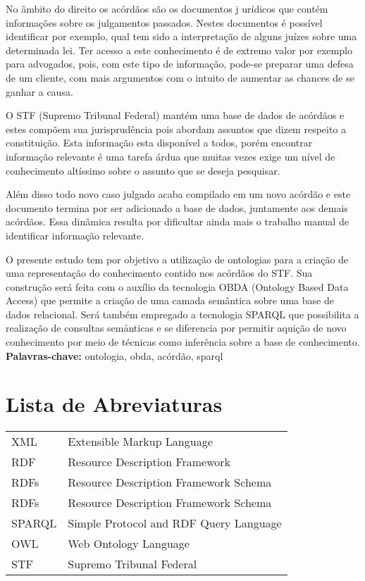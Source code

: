 \documentclass[11pt,twoside,a4paper]{book}
\begin{document}
No âmbito do direito os acórdãos são os documentos j    urídicos que contém informações 
sobre os julgamentos passados. Nestes documentos é possível identificar por exemplo,
qual tem sido a interpretação de alguns juízes sobre uma determinada lei. Ter
acesso a este conhecimento é de extremo valor por exemplo para advogados, pois, 
com este tipo de informação, pode-se preparar uma defesa de um cliente, com mais 
argumentos com o intuito de aumentar as chances de se ganhar a causa.

O STF (Supremo Tribunal Federal) mantém uma base de dados de acórdãos e estes
compõem sua jurisprudência pois abordam assuntos que dizem respeito a constituição. 
Esta informação esta disponível a todos, porém encontrar informação relevante é 
uma tarefa árdua que muitas vezes exige um nível de conhecimento altíssimo sobre 
o assunto que se deseja pesquisar.

Além disso todo novo caso julgado acaba compilado em um novo acórdão e este documento
termina por ser adicionado a base de dados, juntamente aos demais acórdãos. Essa
dinâmica resulta por dificultar ainda mais o trabalho manual de identificar 
informação relevante.

O presente estudo tem por objetivo a utilização de ontologias para a criação de 
uma representação do conhecimento contido nos acórdãos do STF. Sua construção será 
feita com o auxílio da tecnologia OBDA (Ontology Based Data Access) que permite 
a criação de uma camada semântica sobre uma base de dados relacional. Será também 
empregado a tecnologia SPARQL que possibilita a realização de consultas semånticas
e se diferencia por permitir aquição de novo conhecimento por meio de técnicas
como inferência sobre a base de conhecimento.
\\

\noindent \textbf{Palavras-chave:} ontologia, obda, acórdão, sparql

\tableofcontents    %

\chapter{Lista de Abreviaturas}
\begin{tabular}{ll}
    XML & Extensible Markup Language \\
    RDF & Resource Description Framework \\
    RDFs & Resource Description Framework Schema \\
    RDFs & Resource Description Framework Schema \\
    SPARQL & Simple Protocol and RDF Query Language \\
    OWL & Web Ontology Language \\
    STF & Supremo Tribunal Federal \\
\end{tabular}
\end{document}
